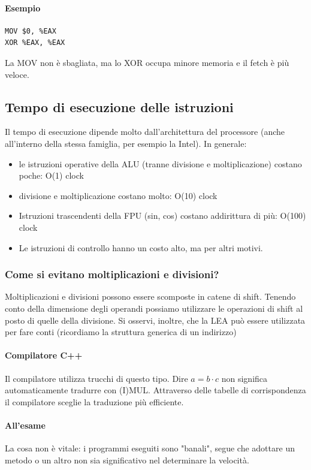 \documentclass[11pt]{report}
\begin{document}
\paragraph{Esempio}
\begin{verbatim}
MOV $0, %EAX
XOR %EAX, %EAX
\end{verbatim}
La MOV non è sbagliata, ma lo XOR occupa minore memoria e il fetch è più veloce.

\subsection{Tempo di esecuzione delle istruzioni}
Il tempo di esecuzione dipende molto dall'architettura del processore (anche all'interno della stessa famiglia, per esempio la Intel). In generale:
\begin{itemize}
\item le istruzioni operative della ALU (tranne divisione e moltiplicazione) costano poche: O(1) clock
\item divisione e moltiplicazione costano molto: O(10) clock
\item Istruzioni trascendenti della FPU (sin, cos) costano addirittura di più: O(100) clock
\item Le istruzioni di controllo hanno un costo alto, ma per altri motivi.
\end{itemize}
\subsubsection{Come si evitano moltiplicazioni e divisioni?}
Moltiplicazioni e divisioni possono essere scomposte in catene di shift. Tenendo conto della dimensione degli operandi possiamo utilizzare le operazioni di shift al posto di quelle della divisione.
Si osservi, inoltre, che la LEA può essere utilizzata per fare conti (ricordiamo la struttura generica di un indirizzo)
\paragraph{Compilatore C++} Il compilatore utilizza trucchi di questo tipo. Dire $a=b \cdot c$ non significa automaticamente tradurre con (I)MUL. Attraverso delle tabelle di corrispondenza il compilatore sceglie la traduzione più efficiente.
\paragraph{All'esame} La cosa non è vitale: i programmi eseguiti sono "banali", segue che adottare un metodo o un altro non sia significativo nel determinare la velocità.
\end{document}
